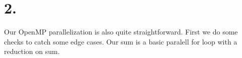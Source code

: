 \section{2.}
Our OpenMP parallelization is also quite straightforward. First we do some checks to catch some edge cases. Our sum is a basic paralell for loop with a reduction on sum.
